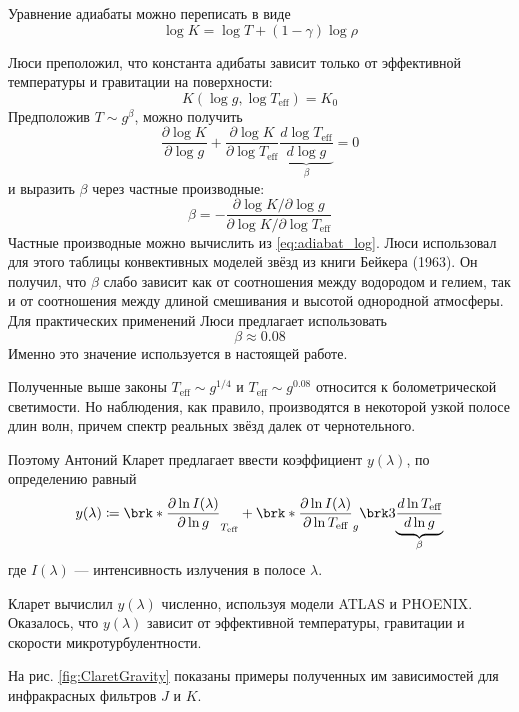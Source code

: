 Уравнение адиабаты можно переписать в виде
\begin{equation}
\log K = \log T + (1 - \gamma) \log \rho
\label{eq:adiabat_log}
\end{equation}

Люси преположил, что константа адибаты зависит только от эффективной температуры и гравитации на поверхности:
\[
K(\log g, \log T_\text{eff}) = K_0
\]
Предположив $T \sim g^\beta$, можно получить
\[
\frac{\partial \log K}{\partial \log g}
+ \frac{\partial \log K}{\partial \log T_\text{eff}}
\underbrace{\frac{d \log T_\text{eff}}{d \log g}}_{\beta} = 0
\]
и выразить $\beta$ через частные производные:
\[
\beta = -\frac{\partial \log K / \partial \log g}{\partial \log K / \partial \log T_\text{eff}}
\]
Частные производные можно вычислить из \eqref{eq:adiabat_log}. Люси использовал для этого таблицы конвективных моделей звёзд из книги Бейкера (1963). Он получил, что $\beta$ слабо зависит как от соотношения между водородом и гелием, так и от соотношения между длиной смешивания и высотой однородной атмосферы. Для практических применений Люси предлагает использовать
\[
\beta \approx 0.08
\]
Именно это значение используется в настоящей работе.



Полученные выше законы $T_\text{eff} \sim g^{1/4}$ и $T_\text{eff} \sim g^{0.08}$ относится к болометрической светимости.
Но наблюдения, как правило, производятся в некоторой узкой полосе длин волн, причем спектр реальных звёзд далек от чернотельного.

Поэтому Антоний Кларет предлагает \cite{ClaretGravity} ввести коэффициент $y(\lambda)$, по определению равный
\begin{equation}
y(\lambda)
\coloneq \brk*{
    \frac{\partial \ln I(\lambda)}{\partial \ln g}
}_{T_\text{eff}}
+\brk*{
    \frac{\partial \ln I(\lambda)}{\partial \ln T_\text{eff}}
}_g
\brk3{
    \underbrace{
        \frac{d \ln T_\text{eff}}{d \ln g}
    }_{\beta}
}
\label{eq:ClaretGravity}
\end{equation}
где $I(\lambda)$ --- интенсивность излучения в полосе $\lambda$.

Кларет вычислил $y(\lambda)$ численно, используя модели ATLAS и PHOENIX. Оказалось, что $y(\lambda)$ зависит от эффективной температуры, гравитации и скорости микротурбулентности.

На рис. \ref{fig:ClaretGravity} показаны примеры полученных им зависимостей для инфракрасных фильтров $J$ и $K$.

